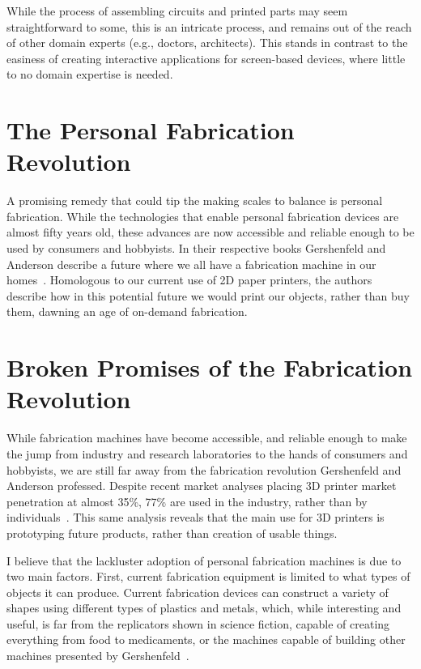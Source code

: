     While the process of assembling circuits and printed parts may seem
    straightforward to some, this is an intricate process, and remains out of
    the reach of other domain experts (e.g., doctors, architects). This stands
    in contrast to the easiness of creating interactive applications for
    screen-based devices, where little to no domain expertise is needed.
   
  \section{The Personal Fabrication Revolution} \label{sec:fab-revolution}
    A promising remedy that could tip the making scales to balance is personal
    fabrication. While the technologies that enable personal fabrication devices
    are almost fifty years old, these advances are now accessible and reliable
    enough to be used by consumers and hobbyists. In their respective books
    Gershenfeld and Anderson describe a future where we all have a fabrication
    machine in our homes~\cite{Gershenfeld:2005, Anderson:2012}. Homologous to
    our current use of 2D paper printers, the authors describe how in this
    potential future we would print our objects, rather than buy them, dawning
    an age of on-demand fabrication.

  \section{Broken Promises of the Fabrication Revolution} \label{sec:broken-promises}
    While fabrication machines have become accessible, and reliable enough to
    make the jump from industry and research laboratories to the hands of
    consumers and hobbyists, we are still far away from the fabrication
    revolution Gershenfeld and Anderson professed. Despite recent market
    analyses placing 3D printer market penetration at almost 35\%, 77\% are used
    in the industry, rather than by individuals~\cite{3DPShare:}. This same
    analysis reveals that the main use for 3D printers is prototyping future
    products, rather than creation of usable things.

    I believe that the lackluster adoption of personal fabrication machines is
    due to two main factors. First, current fabrication equipment is limited to
    what types of objects it can produce. Current fabrication devices can
    construct a variety of shapes using different types of plastics and metals,
    which, while interesting and useful, is far from the replicators shown in
    science fiction, capable of creating everything from food to medicaments, or
    the machines capable of building other machines presented by
    Gershenfeld~\cite{Gershenfeld:2005}.

